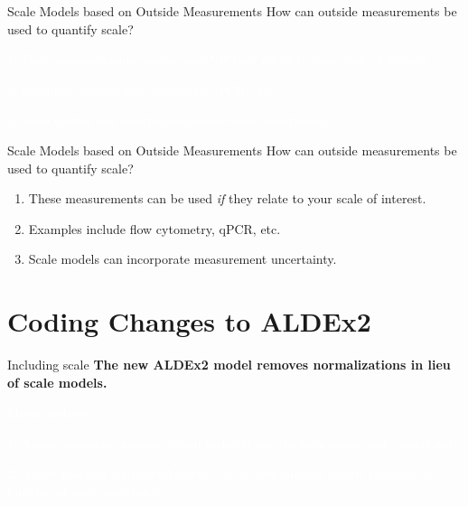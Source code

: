 \documentclass[
  ignorenonframetext,
]{beamer}
\begin{document}
\begin{frame}{Scale Models based on Outside Measurements}
\protect\hypertarget{scale-models-based-on-outside-measurements}{}
How can outside measurements be used to quantify scale?

\vspace{.1in}

\textcolor{white}{1. These measurements can be used *if* they relate to your scale of interest.}

\textcolor{white}{2. Examples include flow cytometry, qPCR, etc.}

\textcolor{white}{3. Scale models can incorporate measurement uncertainty.}
\end{frame}

\begin{frame}{Scale Models based on Outside Measurements}
\protect\hypertarget{scale-models-based-on-outside-measurements-1}{}
How can outside measurements be used to quantify scale?

\vspace{.1in}

\begin{enumerate}
\item
  These measurements can be used \emph{if} they relate to your scale of
  interest.
\item
  Examples include flow cytometry, qPCR, etc.
\item
  Scale models can incorporate measurement uncertainty.
\end{enumerate}
\end{frame}

\hypertarget{coding-changes-to-aldex2}{%
\section{Coding Changes to ALDEx2}\label{coding-changes-to-aldex2}}

\begin{frame}{Including scale}
\protect\hypertarget{including-scale}{}
\textbf{The new ALDEx2 model removes normalizations in lieu of scale
models.}

\vspace{.25in}

\textcolor{white}{Major updates:}

\textcolor{white}{1. A new argument `gamma` which makes it easy to incorporate scale uncertainty.}

\textcolor{white}{2. A new function `aldex.senAnalysis` to see how analysis results change as a function of scale uncertainty.}
\end{frame}
\end{document}
